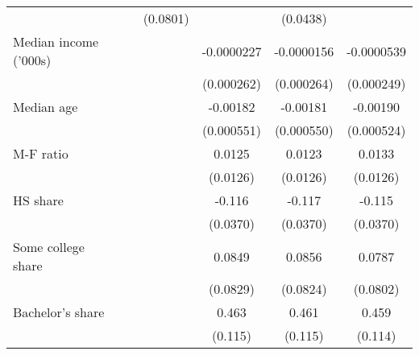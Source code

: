 {\begin{tabular}{l*{6}{c}}
                    &                     &                     &    (0.0801)         &                     &    (0.0438)         &                     \\
\addlinespace
Median income ('000s)&                     &                     &                     &  -0.0000227         &  -0.0000156         &  -0.0000539         \\
                    &                     &                     &                     &  (0.000262)         &  (0.000264)         &  (0.000249)         \\
\addlinespace
Median age          &                     &                     &                     &    -0.00182\sym{***}&    -0.00181\sym{***}&    -0.00190\sym{***}\\
                    &                     &                     &                     &  (0.000551)         &  (0.000550)         &  (0.000524)         \\
\addlinespace
M-F ratio           &                     &                     &                     &      0.0125         &      0.0123         &      0.0133         \\
                    &                     &                     &                     &    (0.0126)         &    (0.0126)         &    (0.0126)         \\
\addlinespace
HS share            &                     &                     &                     &      -0.116\sym{***}&      -0.117\sym{***}&      -0.115\sym{***}\\
                    &                     &                     &                     &    (0.0370)         &    (0.0370)         &    (0.0370)         \\
\addlinespace
Some college share  &                     &                     &                     &      0.0849         &      0.0856         &      0.0787         \\
                    &                     &                     &                     &    (0.0829)         &    (0.0824)         &    (0.0802)         \\
\addlinespace
Bachelor's share    &                     &                     &                     &       0.463\sym{***}&       0.461\sym{***}&       0.459\sym{***}\\
                    &                     &                     &                     &     (0.115)         &     (0.115)         &     (0.114)         \\

\end{tabular}}
